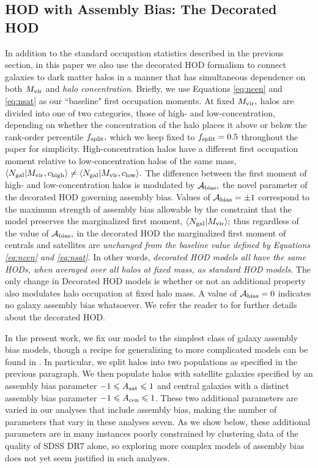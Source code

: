 \documentclass[usenatbib,usegraphicx,letterpaper]{mn2e}
\newcommand{\mvir}{M_{\rm vir}}
\newcommand{\ngal}{N_{\rm gal}}
\newcommand{\abias}{\mathcal{A}_{\rm bias}}
\begin{document}
\subsection{HOD with Assembly Bias: The Decorated HOD}
\label{subsection:decorated}

In addition to the standard occupation statistics described in the
previous section, in this paper we also use the decorated HOD
formalism to connect galaxies to dark matter halos in a manner that
has simultaneous dependence on both $\mvir$ and {\em halo concentration}.
Briefly, we use Equations \ref{eq:ncen} and \ref{eq:nsat} as our
``baseline" first occupation moments.  At fixed $\mvir,$ halos are
divided into one of two categories, those of high- and
low-concentration, depending on whether the concentration of the halo
places it above or below the rank-order percentile $f_{\rm split},$
which we keep fixed to $f_{\rm split}=0.5$ throughout the paper for
simplicity. High-concentration halos have a different first
occupation moment relative to low-concentration halos of the same
mass, $\langle\ngal|\mvir, c_{\rm high}\rangle \neq
\langle\ngal|\mvir, c_{\rm low}\rangle.$ The difference between the
first moment of high- and low-concentration halos is modulated by
$\abias,$ the novel parameter of the decorated HOD governing assembly
bias. Values of $\abias=\pm1$ correspond to the maximum strength of
assembly bias allowable by the constraint that the model preserves the
marginalized first moment, $\langle\ngal|\mvir\rangle;$ thus
regardless of the value of $\abias,$ in the decorated HOD the
marginalized first moment of centrals and satellites are {\em
  unchanged from the baseline value defined by Equations \ref{eq:ncen}
  and \ref{eq:nsat}}. In other words, {\em decorated HOD models all have the same HODs,
when averaged over all halos at fixed mass, as standard HOD
models}. The only change in Decorated HOD models is whether or not an
additional property also modulates halo occupation at fixed halo
mass. A value of $\abias = 0$ indicates no galaxy assembly bias
whatsoever. We refer the reader to \citet{hearin_etal16} for further
details about the decorated HOD.

In the present work, we fix our model to the simplest class of galaxy
assembly bias models, though a recipe for generalizing to more
complicated models can be found in \citet{hearin_etal16}. In
particular, we split halos into two populations as specified in the
previous paragraph. We then populate halos with satellite galaxies
specified by an assembly bias parameter $-1 \le A_{\rm sat} \le 1$ and
central galaxies with a distinct assembly bias parameter
$-1 \le A_{\rm cen} \le 1$. These two additional parameters are varied in our
analyses that include assembly bias, making the number of parameters
that vary in these analyses seven. As we show below, these additional
parameters are in many instances poorly constrained by clustering data
of the quality of SDSS DR7 alone, so exploring more complex models of
assembly bias does not yet seem justified in such analyses.
\end{document}
